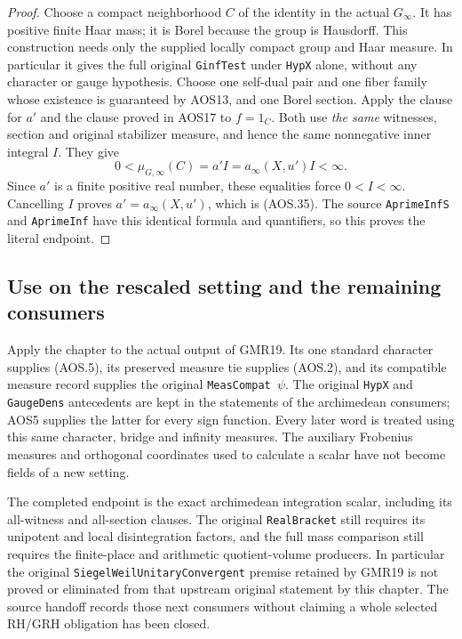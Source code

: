 \documentclass[11pt,a4paper]{article}
\numberwithin{equation}{section}
\theoremstyle{remark}\newtheorem{remark}[theorem]{Remark}
\begin{document}
\begin{proof}
Choose a compact neighborhood $C$ of the identity in the actual
$G_\infty$.  It has positive finite Haar mass; it is Borel because
the group is Hausdorff.  This construction needs only the supplied
locally compact group and Haar measure.  In particular it gives
the full original \texttt{Ginf\allowbreak Test} under \texttt{Hyp\allowbreak X} alone,
without any character or gauge hypothesis.  Choose one self-dual
pair and one fiber family
whose existence is guaranteed by AOS13, and one Borel section.
Apply the clause for $a'$ and the clause proved in AOS17 to
$f=1_C$.  Both use \emph{the same} witnesses, section and original
stabilizer measure, and hence the same nonnegative inner integral
$I$.  They give
\[
              0<\mu_{G,\infty}(C)=a'I
                      =a_\infty(X,u')I<\infty.
\]
Since $a'$ is a finite positive real number, these equalities
force $0<I<\infty$.  Cancelling $I$ proves
$a'=a_\infty(X,u')$, which is (AOS.35).  The source
\texttt{Aprime\allowbreak Inf\allowbreak S} and \texttt{Aprime\allowbreak Inf} have this identical
formula and quantifiers, so this proves the literal endpoint.
\end{proof}

\subsection{Use on the rescaled setting and the remaining consumers}

Apply the chapter to the actual output of GMR19.  Its one standard
character supplies (AOS.5), its preserved measure tie supplies
(AOS.2), and its compatible measure record supplies the original
\texttt{Meas\allowbreak Compat\,$\psi$}.  The original \texttt{Hyp\allowbreak X} and
\texttt{Gauge\allowbreak Dens} antecedents are kept in the statements of the
archimedean consumers; AOS5 supplies the latter for every sign
function.  Every later word is treated using this same
character, bridge and infinity measures.  The auxiliary Frobenius
measures and orthogonal coordinates used to calculate a scalar
have not become fields of a new setting.

The completed endpoint is the exact archimedean integration scalar,
including its all-witness and all-section clauses.  The original
\texttt{Real\allowbreak Bracket} still requires its unipotent and local
disintegration factors, and the full mass comparison still requires
the finite-place and arithmetic quotient-volume producers.  In
particular the original \texttt{Siegel\allowbreak Weil\allowbreak Unitary\allowbreak Convergent}
premise retained by GMR19 is not proved or eliminated from that
upstream original statement by this chapter.  The source handoff
records those next consumers without claiming a whole selected
RH/GRH obligation has been closed.
\end{document}
